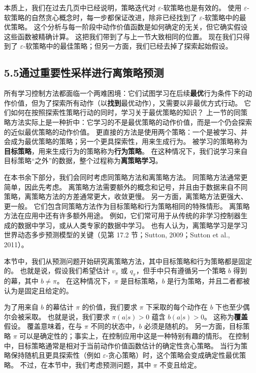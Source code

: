 \documentclass[UTF8, 12pt, fontset=fandol, oneside]{ctexart}
\begin{document}
本质上，我们在过去几页中已经说明，策略迭代对 $\varepsilon$-软策略也是有效的。
使用 $\varepsilon$-软策略的自然贪心概念时，每一步都保证改进，除非已经找到了 $\varepsilon$-软策略中的最优策略。
这个分析与每一阶段中动作价值函数是如何确定的无关，但它确实假设这些函数被精确计算。
这把我们带到了与上一节大致相同的位置。
现在我们只得到了 $\varepsilon$-软策略中的最佳策略；但另一方面，我们已经去掉了探索起始假设。

\subsection*{5.5\quad 通过重要性采样进行离策略预测}

所有学习控制方法都面临一个两难困境：它们试图学习在后续\textbf{最优}行为条件下的动作价值，但为了探索所有动作（以\textbf{找到}最优动作），又需要以非最优方式行动。
它们如何在按照探索性策略行动的同时，学习关于最优策略的知识？
上一节的同策略方法实际上是一种折中：它学习的不是最优策略的动作价值，而是一个仍会探索的近似最优策略的动作价值。
更直接的方法是使用两个策略：一个是被学习、并会成为最优策略的策略；另一个更具探索性，用来生成行为。
被学习的策略称为\textbf{目标策略}，用来生成行为的策略称为\textbf{行为策略}。
在这种情况下，我们说学习来自目标策略“之外”的数据，整个过程称为\textbf{离策略学习}。

在本书余下部分，我们会同时考虑同策略方法和离策略方法。
同策略方法通常更简单，因此先考虑。
离策略方法需要额外的概念和记号，并且由于数据来自不同策略，离策略方法的方差通常更大，收敛更慢。
另一方面，离策略方法更强大、更一般。
它们包含同策略方法作为目标策略和行为策略相同的特殊情形。
离策略方法在应用中还有许多额外用途。
例如，它们常可用于从传统的非学习控制器生成的数据中学习，或从人类专家的数据中学习。
也有人认为，离策略学习是学习世界动态多步预测模型的关键（见第 17.2 节；Sutton, 2009；Sutton et al., 2011）。

本节中，我们从预测问题开始研究离策略方法，其中目标策略和行为策略都是固定的。
也就是说，假设我们希望估计 $v_\pi$ 或 $q_\pi$，但手中只有遵循另一个策略 $b$ 得到的幕，其中 $b\ne\pi$。
在这种情况下，$\pi$ 是目标策略，$b$ 是行为策略，并且二者都被认为是固定且给定的。

为了用来自 $b$ 的幕估计 $\pi$ 的价值，我们要求 $\pi$ 下采取的每个动作在 $b$ 下也至少偶尔会被采取。
也就是说，我们要求 $\pi(a|s)>0$ 蕴含 $b(a|s)>0$。
这称为\textbf{覆盖}假设。
覆盖意味着，在与 $\pi$ 不同的状态中，$b$ 必须是随机的。
另一方面，目标策略 $\pi$ 可以是确定性的；事实上，在控制应用中这是一种特别有趣的情形。
在控制中，目标策略通常是相对于当前动作价值函数估计的确定性贪心策略。
当行为策略保持随机且更具探索性（例如 $\varepsilon$-贪心策略）时，这个策略会变成确定性最优策略。
不过，在本节中，我们考虑预测问题，其中 $\pi$ 不变且给定。
\end{document}
